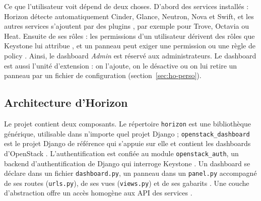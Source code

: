 Ce que l'utilisateur voit dépend de deux choses. D'abord des services installés : Horizon détecte automatiquement Cinder,
Glance, Neutron, Nova et Swift, et les autres services s'ajoutent par des plugins \parencite{horizon-requirements}, par
exemple pour Trove, Octavia ou Heat. Ensuite de ses rôles : les permissions d'un utilisateur dérivent des rôles que
Keystone lui attribue \parencite{horizon-auth-backend}, et un panneau peut exiger une permission ou une règle de \gls{policy}
\parencite{horizon-quickstart}. Ainsi, le dashboard \emph{Admin} est réservé aux administrateurs. Le dashboard est aussi
l'unité d'extension : on l'ajoute, on le désactive ou on lui retire un panneau par un fichier de configuration
(section~\ref{sec:ho-perso}).

\subsection{Architecture d'Horizon}\label{sec:ho-archi}

Le projet contient deux composants. Le répertoire \texttt{horizon} est une bibliothèque générique, utilisable dans n'importe
quel projet Django ; \texttt{openstack\_\allowbreak dashboard} est le projet Django de référence qui s'appuie sur elle et contient les
dashboards d'OpenStack \parencite{horizon-quickstart}. L'authentification est confiée au module \texttt{openstack\_\allowbreak auth}, un
backend d'authentification de Django qui interroge Keystone \parencite{horizon-auth-backend}. Un dashboard se déclare dans un fichier
\texttt{dashboard.py}, un panneau dans un \texttt{panel.py} accompagné de ses routes (\texttt{urls.py}), de ses vues
(\texttt{views.py}) et de ses gabarits \parencite{horizon-quickstart}. Une couche d'abstraction offre un accès homogène aux
API des services \parencite{horizon-intro}.

